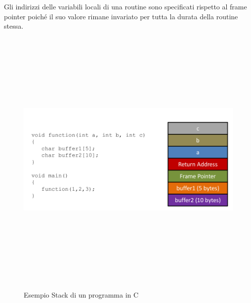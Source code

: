 Gli indirizzi delle variabili locali di una routine sono specificati rispetto al frame pointer poiché il suo valore rimane invariato per tutta la durata della routine stessa. \newline \newline
\begin{figure}[htbp]
	\centering%
	\subfigure%
	{\includegraphics[height=13cm, width=13cm, keepaspectratio]{Immagini/sistemi_operativi/esempio_stack.png}}
	\caption{Esempio Stack di un programma in C\label{fig:esempio_stack}} 	
\end{figure}
